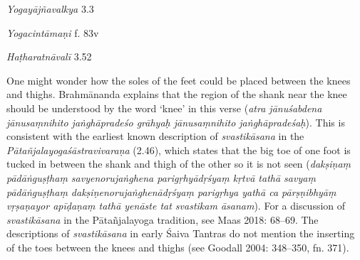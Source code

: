 \begin{ekdosis}
\begin{sources}[hp01_019]
\emph{Yogayājñavalkya} 3.3

\begin{versinnote}
\end{versinnote}

\end{sources}

\begin{testimonia}[hp01_019]
\emph{Yogacintāmaṇi} f. 83v

\begin{versinnote}
\end{versinnote}

\emph{Haṭharatnāvalī} 3.52

\begin{versinnote}
\end{versinnote}

\end{testimonia}

\begin{philcomm}[hp01_019]        
One might wonder how the soles of the feet could be placed between the knees and thighs. Brahmānanda explains that the region of the shank near the knee should be understood by the word ‘knee’ in this verse (\emph{atra jānuśabdena jānusaṃnihito jaṅghāpradeśo grāhyaḥ jānusaṃnihito jaṅghāpradeśaḥ}). This is consistent with the earliest known description of \emph{svastikāsana} in the \emph{Pātañjalayogaśāstravivaraṇa} (2.46), which states that the big toe of one foot is tucked in between the shank and thigh of the other so it is not seen (\emph{dakṣiṇaṃ pādāṅguṣṭhaṃ savyenorujaṅghena parigṛhyādṛśyaṃ kṛtvā tathā savyaṃ pādāṅguṣṭhaṃ dakṣiṇenorujaṅghenādṛśyaṃ parigṛhya yathā ca pārṣṇibhyāṃ vṛṣaṇayor apīḍaṇaṃ tathā yenāste tat svastikam āsanam}). For a discussion of \emph{svastikāsana} in the Pātañjalayoga tradition, see Maas 2018: 68–69. The descriptions of \emph{svastikāsana} in early Śaiva Tantras do not mention the inserting of the toes between the knees and thighs (see Goodall 2004: 348–350, fn. 371).
\end{philcomm}


\end{ekdosis}

